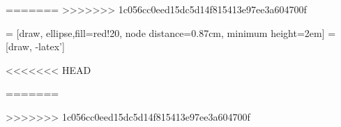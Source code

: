 \def\itemsymbol{$\blacktriangleright$}
\let\svpar\par
\let\svitemize\itemize
\let\svenditemize\enditemize
\let\svitem\item
\let\svcenter\center
\let\svendcenter\endcenter
\let\svcolumn\column
\let\svendcolumn\endcolumn
\def\newitem{\renewcommand\item[1][\itemsymbol]{\vfill\svitem[##1]}}%
\def\newpar{\def\par{\svpar\vfill}}%
\newcommand\stretchon{%
	\newpar%
	\renewcommand\item[1][\itemsymbol]{\svitem[##1]\newitem}%
	\renewenvironment{itemize}%
	{\svitemize}{\svenditemize\newpar\par}%
	\renewenvironment{center}%
	{\svcenter\newpar}{\svendcenter\newpar}%
	\renewenvironment{column}[2]%
	{\svcolumn{##1}\setlength{\parskip}{\columnskip}##2}%
	{\svendcolumn\vspace{\columnskip}}%
}
\newcommand\stretchoff{%
	\let\par\svpar%
	\let\item\svitem%
	\let\itemize\svitemize%
	\let\enditemize\svenditemize%
	\let\center\svcenter%
	\let\endcenter\svendcenter%
	\let\column\svcolumn%
	\let\endcolumn\svendcolumn%
}
\newlength\columnskip
\columnskip 0pt

=======
>>>>>>> 1c056cc0eed15dc5d14f815413e97ee3a604700f
\usepackage{tikz}
\usetikzlibrary{shapes,arrows}
\usetikzlibrary{positioning}
 = [draw, ellipse,fill=red!20, node distance=0.87cm,
minimum height=2em]
 = [draw, -latex']
\usetikzlibrary{shapes.symbols,shapes.callouts,patterns}
\usetikzlibrary{calc,fit}
\usetikzlibrary{backgrounds}

\usetikzlibrary{decorations.pathmorphing,backgrounds,positioning,fit,petri}
\usetikzlibrary{automata}

<<<<<<< HEAD
\usepackage{makeidx}
\makeindex
\newenvironment{theindex}
 {\let\item\par
  }{}
\newcommand\indexspace{}
=======

>>>>>>> 1c056cc0eed15dc5d14f815413e97ee3a604700f
